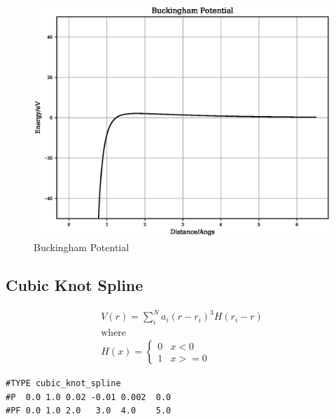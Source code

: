 \FloatBarrier
\begin{figure}[h]
  \begin{center}
    \includegraphics[scale=0.5]{appendix/functions/plots/buckingham.eps}
    \caption{Buckingham Potential}
    \label{graph:graph1}
  \end{center}
\end{figure}
\FloatBarrier







\subsection{Cubic Knot Spline}

\begin{equation}
\begin{split}
V(r) = \sum_i^N a_i (r - r_i)^3 H(r_i - r) \\
\text{where } \\
H(x) = \left\{ \begin{matrix} 0 & x<0 \\  1 & x >= 0 \end{matrix} \right . 
\end{split}
\label{eq:cubicKnotSpline}
\end{equation}


\begin{lstlisting}[style=pseudocode,caption={Cubic Knot Spline}]
#TYPE cubic_knot_spline
#P  0.0 1.0 0.02 -0.01 0.002  0.0
#PF 0.0 1.0 2.0   3.0  4.0    5.0
\end{lstlisting}

